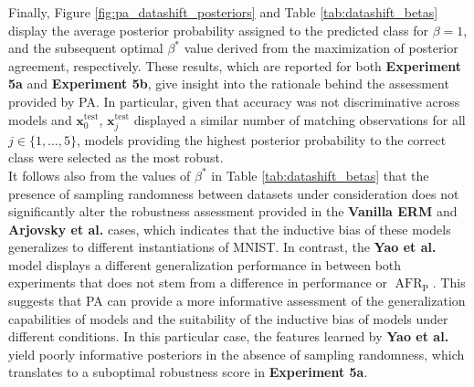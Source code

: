 Finally, Figure \ref{fig:pa_datashift_posteriors} and Table \ref{tab:datashift_betas} display the average posterior
probability assigned to the predicted class for $\beta=1$, and the subsequent optimal $\beta^{*}$ value
derived from the maximization of posterior agreement, respectively. These results, which are reported for both
\textbf{Experiment 5a} and \textbf{Experiment 5b}, give insight into the rationale behind the assessment provided 
by PA. In particular, given that accuracy was not discriminative across models and $\bm{x}_0^{\text{test}}$, 
$\bm{x}_j^{\text{test}}$ displayed a similar number of matching observations for all $j \in \{1, \dots, 5\}$,
models providing the highest posterior probability to the correct class were selected as the most robust. \\

It follows also from the values of $\beta^{*}$ in Table \ref{tab:datashift_betas} that the presence of sampling 
randomness between datasets under consideration does not significantly alter the robustness assessment provided
in the {\color{tab:blue} \textbf{Vanilla ERM}} and {\color{tab:orange} \textbf{Arjovsky et al.}} cases, which indicates
that the inductive bias of these models generalizes to different instantiations of MNIST. In contrast, the 
{\color{tab:green} \textbf{Yao et al.}} model displays a different generalization performance in between
both experiments that does not stem from a difference in performance or $\operatorname{AFR}_{\text{P}}$. This 
suggests that PA can provide a more informative assessment of the generalization capabilities of models
and the suitability of the inductive bias of models under different conditions. In this particular case, the
features learned by {\color{tab:green} \textbf{Yao et al.}} yield poorly informative posteriors in the absence of
sampling randomness, which translates to a suboptimal robustness score in \textbf{Experiment 5a}. \\


